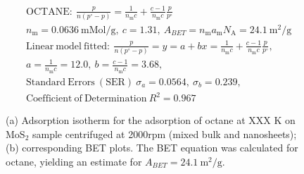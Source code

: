 

\begin{align*}
&\mathrm{OCTANE:}\ \frac{p}{n(p^\circ-p)}=\frac{1}{n_\mathrm{m}c}+\frac{c-1}{n_\mathrm{m}c}\frac{p}{p^\circ}\\
&{n_\mathrm{m}}=0.0636\ \mathrm{mMol/g},\ c=1.31,\ A_{BET}={n_\mathrm{m}}{a_\mathrm{m}}{N_\mathrm{A}}=24.1\ \mathrm{m}^2\mathrm{/g}\\
&\mathrm{Linear\ model\ fitted:}\ \frac{p}{n(p^\circ-p)}=y=a+bx=\frac{1}{n_\mathrm{m}c}+\frac{c-1}{n_\mathrm{m}c}\frac{p}{p^\circ},\\
&a=\frac{1}{n_\mathrm{m}c}=12.0,\ b=\frac{c-1}{n_\mathrm{m}c}=3.68,\\
&\mathrm{Standard\ Errors\ (SER)}\ \sigma_a=0.0564,\ \sigma_b=0.239,\\
&\mathrm{Coefficient\ of\ Determination}\ R^2 = 0.967
\end{align*}


\begin{figure}[htb]
\hfill
{}
\caption{(a) Adsorption isotherm for the adsorption of octane at XXX K on MoS$_2$ 
sample centrifuged at 2000rpm (mixed bulk and nanosheets);
(b) corresponding BET plots. The BET equation was calculated for octane, yielding an estimate for $A_{BET}=24.1\ \mathrm{m}^2\mathrm{/g}$.}

\label{fig:sa-Nanosheets-Prep-I-750rpm-20mg-01-3mm-30C-S1-SA-10ml}
\end{figure}


